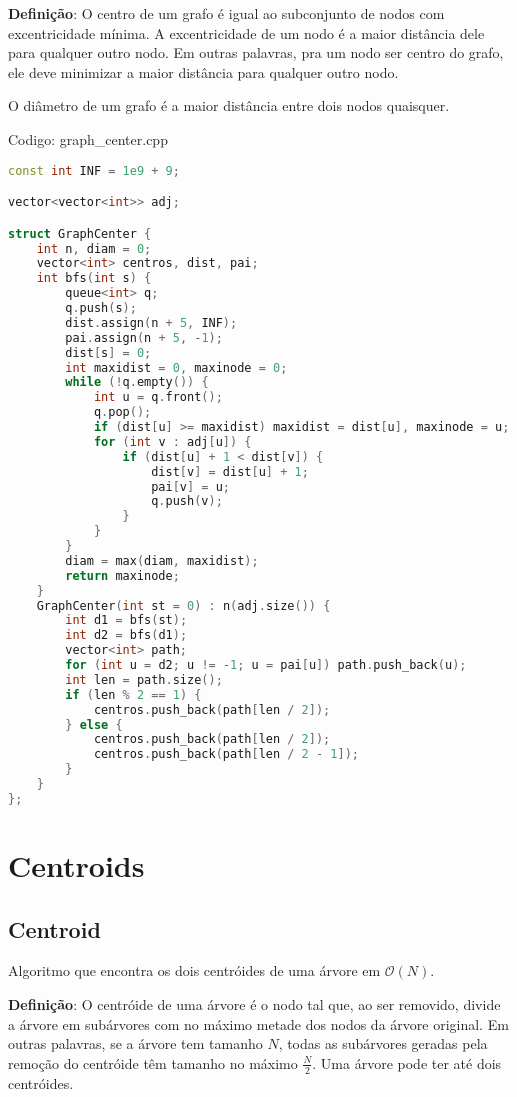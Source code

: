 \documentclass[10pt, a4paper, oneside]{book}
\begin{document}
\textbf{Definição}: O centro de um grafo é igual ao subconjunto de nodos com excentricidade mínima. A excentricidade de um nodo é a maior distância dele para qualquer outro nodo. Em outras palavras, pra um nodo ser centro do grafo, ele deve minimizar a maior distância para qualquer outro nodo.



O diâmetro de um grafo é a maior distância entre dois nodos quaisquer.
\hfill

Codigo: graph\_center.cpp

\begin{lstlisting}[language=C++]
const int INF = 1e9 + 9;

vector<vector<int>> adj;

struct GraphCenter {
    int n, diam = 0;
    vector<int> centros, dist, pai;
    int bfs(int s) {
        queue<int> q;
        q.push(s);
        dist.assign(n + 5, INF);
        pai.assign(n + 5, -1);
        dist[s] = 0;
        int maxidist = 0, maxinode = 0;
        while (!q.empty()) {
            int u = q.front();
            q.pop();
            if (dist[u] >= maxidist) maxidist = dist[u], maxinode = u;
            for (int v : adj[u]) {
                if (dist[u] + 1 < dist[v]) {
                    dist[v] = dist[u] + 1;
                    pai[v] = u;
                    q.push(v);
                }
            }
        }
        diam = max(diam, maxidist);
        return maxinode;
    }
    GraphCenter(int st = 0) : n(adj.size()) {
        int d1 = bfs(st);
        int d2 = bfs(d1);
        vector<int> path;
        for (int u = d2; u != -1; u = pai[u]) path.push_back(u);
        int len = path.size();
        if (len % 2 == 1) {
            centros.push_back(path[len / 2]);
        } else {
            centros.push_back(path[len / 2]);
            centros.push_back(path[len / 2 - 1]);
        }
    }
};
\end{lstlisting}
\hfill

\section{Centroids}
\subsection{Centroid}


Algoritmo que encontra os dois centróides de uma árvore em $\mathcal{O}(N)$.



\textbf{Definição}: O centróide de uma árvore é o nodo tal que, ao ser removido, divide a árvore em subárvores com no máximo metade dos nodos da árvore original. Em outras palavras, se a árvore tem tamanho $N$, todas as subárvores geradas pela remoção do centróide têm tamanho no máximo $\frac{N}{2}$. Uma árvore pode ter até dois centróides.
\hfill
\end{document}
